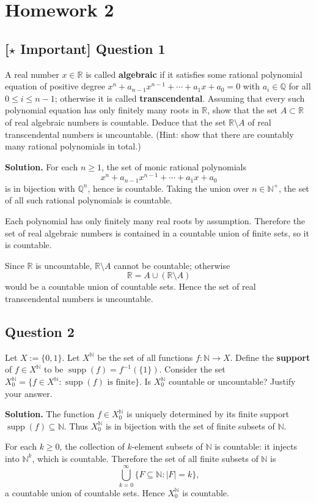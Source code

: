 \documentclass{article}
\newcommand{\R}{\mathbb{R}}
\newcommand{\Q}{\mathbb{Q}}
\newcommand{\N}{\mathbb{N}}
\newcommand{\important}{\texorpdfstring{\textbf{[\(\star\) Important]}}{[Important]}}
\newenvironment{solution}{\par\noindent\textbf{Solution.}\quad}{\par}
\begin{document}
\section{Homework 2}

\subsection{\important{} Question 1}
A real number $x \in \R$ is called \textbf{algebraic} if it satisfies some rational polynomial equation of positive degree $x^n + a_{n-1}x^{n-1} + \cdots + a_1 x + a_0 = 0$ with $a_i \in \Q$ for all $0 \le i \le n-1$; otherwise it is called \textbf{transcendental}. Assuming that every such polynomial equation has only finitely many roots in $\R$, show that the set $A \subset \R$ of real algebraic numbers is countable. Deduce that the set $\R \setminus A$ of real transcendental numbers is uncountable. (Hint: show that there are countably many rational polynomials in total.)

\begin{solution}
For each $n\ge1$, the set of monic rational polynomials
\[
  x^n+a_{n-1}x^{n-1}+\cdots+a_1x+a_0
\]
is in bijection with $\Q^n$, hence is countable. Taking the union over
$n\in\N^+$, the set of all such rational polynomials is countable.

Each polynomial has only finitely many real roots by assumption. Therefore
the set of real algebraic numbers is contained in a countable union of
finite sets, so it is countable.

Since $\R$ is uncountable, $\R\setminus A$ cannot be countable; otherwise
\[
  \R=A\cup(\R\setminus A)
\]
would be a countable union of countable sets. Hence the set of real
transcendental numbers is uncountable.
\end{solution}

\subsection{Question 2}
Let $X := \{0, 1\}$. Let $X^{\N}$ be the set of all functions $f : \N \to X$. Define the \textbf{support} of $f \in X^{\N}$ to be $\operatorname{supp}(f) = f^{-1}(\{1\})$. Consider the set $X_0^{\N} = \{f \in X^{\N} : \operatorname{supp}(f) \text{ is finite}\}$. Is $X_0^{\N}$ countable or uncountable? Justify your answer.

\begin{solution}
The function $f\in X_0^\N$ is uniquely determined by its finite support
$\operatorname{supp}(f)\subseteq\N$. Thus $X_0^\N$ is in bijection with
the set of finite subsets of $\N$.

For each $k\ge0$, the collection of $k$-element subsets of $\N$ is
countable: it injects into $\N^k$, which is countable. Therefore the set
of all finite subsets of $\N$ is
\[
  \bigcup_{k=0}^{\infty}\{F\subseteq\N:|F|=k\},
\]
a countable union of countable sets. Hence $X_0^\N$ is countable.
\end{solution}
\end{document}
